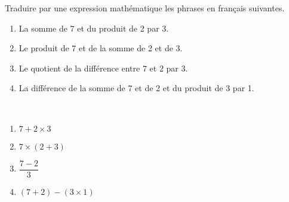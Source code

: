 \begin{exercice}%
    Traduire par une expression mathématique les phrases en français suivantes.
    \begin{enumerate}
       \item La somme de 7 et du produit de 2 par 3.
       \item Le produit de 7 et de la somme de 2 et de 3.
       \item Le quotient de la différence entre 7 et 2 par 3.
       \item La différence de la somme de 7 et de 2 et du produit de 3 par 1.
    \end{enumerate}
 \end{exercice}
 
 \begin{corrige}
    \ \\ [-5mm]
    \begin{enumerate}
       \item \blue $7+2\times3$
       \item \blue $7\times(2+3)$ \smallskip
       \item \blue $\dfrac{7-2}{3}$ \medskip
       \item \blue $(7+2)-(3\times1)$
    \end{enumerate}
 \end{corrige}